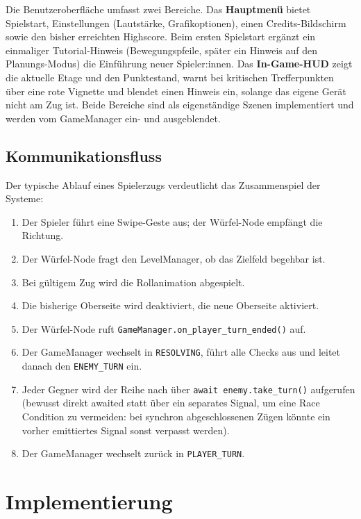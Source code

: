 \documentclass[oneside]{ausarbeitung}
\begin{document}
Die Benutzeroberfläche umfasst zwei Bereiche. Das \textbf{Hauptmenü} bietet Spielstart, Einstellungen (Lautstärke, Grafikoptionen), einen Credits-Bildschirm sowie den bisher erreichten Highscore. Beim ersten Spielstart ergänzt ein einmaliger Tutorial-Hinweis (Bewegungspfeile, später ein Hinweis auf den Planungs-Modus) die Einführung neuer Spieler:innen. Das \textbf{In-Game-HUD} zeigt die aktuelle Etage und den Punktestand, warnt bei kritischen Trefferpunkten über eine rote Vignette und blendet einen Hinweis ein, solange das eigene Gerät nicht am Zug ist. Beide Bereiche sind als eigenständige Szenen implementiert und werden vom GameManager ein- und ausgeblendet.
 
\section{Kommunikationsfluss}
 
Der typische Ablauf eines Spielerzugs verdeutlicht das Zusammenspiel der Systeme:
 
\begin{enumerate}
    \item Der Spieler führt eine Swipe-Geste aus; der Würfel-Node empfängt die Richtung.
    \item Der Würfel-Node fragt den LevelManager, ob das Zielfeld begehbar ist.
    \item Bei gültigem Zug wird die Rollanimation abgespielt.
    \item Die bisherige Oberseite wird deaktiviert, die neue Oberseite aktiviert.
    \item Der Würfel-Node ruft \texttt{GameManager.on\_player\_turn\_ended()} auf.
    \item Der GameManager wechselt in \texttt{RESOLVING}, führt alle Checks aus und leitet danach den \texttt{ENEMY\_TURN} ein.
    \item Jeder Gegner wird der Reihe nach über \texttt{await enemy.take\_turn()} aufgerufen (bewusst direkt awaited statt über ein separates Signal, um eine Race Condition zu vermeiden: bei synchron abgeschlossenen Zügen könnte ein vorher emittiertes Signal sonst verpasst werden).
    \item Der GameManager wechselt zurück in \texttt{PLAYER\_TURN}.
\end{enumerate}

\chapter{Implementierung}
\label{cha:implementierung}
\end{document}
